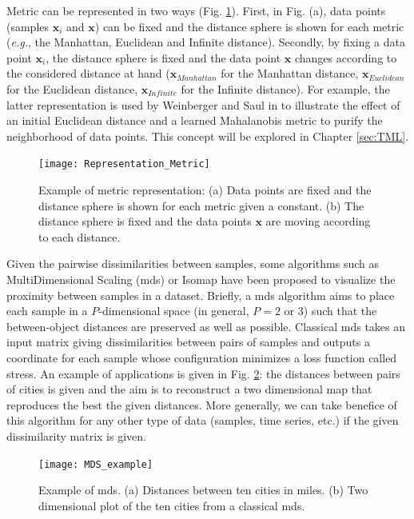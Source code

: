 Metric can be represented in two ways (Fig. \ref{fig:Representation_Metric}). First, in Fig. (a), data points (samples $\textbf{x}_i$ and $\textbf{x}$) can be fixed and the distance sphere is shown for each metric (\textit{e.g.}, the Manhattan, Euclidean and Infinite distance). Secondly, by fixing a data point $\textbf{x}_i$, the distance sphere is fixed and the data point $\textbf{x}$ changes according to the considered distance at hand ($\textbf{x}_{Manhattan}$ for the Manhattan distance, $\textbf{x}_{Euclidean}$ for the Euclidean distance, $\textbf{x}_{Infinite}$ for the Infinite distance). For example, the latter representation is used by Weinberger and Saul in \cite{Weinberger2009} to illustrate the effect of an initial Euclidean distance and a learned Mahalanobis metric to purify the neighborhood of data points. This concept will be explored in Chapter \ref{sec:TML}.

\begin{figure}[h!]
	\centering
	\texttt{[image: Representation\_Metric]}
	\caption[Example of metric representation]{Example of metric representation: (a) Data points are fixed and the distance sphere is shown for each metric given a constant. (b) The distance sphere is fixed and the data points $\textbf{x}$ are moving according to each distance.}
	\label{fig:Representation_Metric}
\end{figure}

Given the pairwise dissimilarities between samples, some algorithms such as MultiDimensional Scaling ({\sc mds}) \cite{Carroll1980} or Isomap \cite{Geng2005} have been proposed to visualize the proximity between samples in a dataset. Briefly, a {\sc mds} algorithm aims to place each sample in a $P$-dimensional space (in general, $P=2$ or $3$) such that the between-object distances are preserved as well as possible. Classical {\sc mds} takes an input matrix giving dissimilarities between pairs of samples and outputs a coordinate for each sample whose configuration minimizes a loss function called stress. An example of applications is given in Fig. \ref{fig:MDS_example}: the distances between pairs of cities is given and the aim is to reconstruct a two dimensional map that reproduces the best the given distances. More generally, we can take benefice of this algorithm for any other type of data (samples, time series, etc.) if the given dissimilarity matrix is given.

\begin{figure}[h!]
	\centering
	\texttt{[image: MDS\_example]}
	\caption[Example of {\sc mds}]{Example of {\sc mds}. (a) Distances between ten cities in miles. (b) Two dimensional plot of the ten cities from a classical {\sc mds}\protect\footnotemark.}
	\label{fig:MDS_example}
\end{figure}
